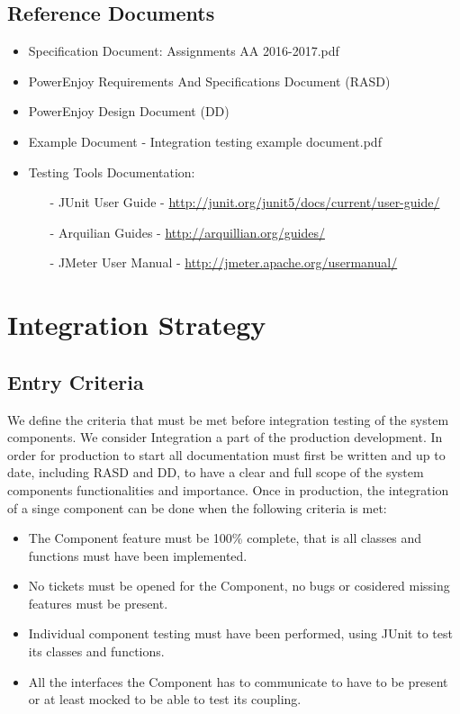 \documentclass[a4paper]{article}
\begin{document}
\subsection{Reference Documents}
\begin{itemize}
\item Specification Document: Assignments AA 2016-2017.pdf
\item PowerEnjoy Requirements And Specifications Document (RASD)
\item PowerEnjoy Design Document (DD)
\item Example Document - Integration testing example document.pdf
\item Testing Tools Documentation:
\begin{itemize}
\item[-] JUnit User Guide - \url{http://junit.org/junit5/docs/current/user-guide/}
\item[-] Arquilian Guides - \url{http://arquillian.org/guides/}
\item[-] JMeter User Manual - \url{http://jmeter.apache.org/usermanual/}
\end{itemize}
\end{itemize}


\newpage
\section{Integration Strategy}
\subsection{Entry Criteria}
We define the criteria that must be met before integration testing of the system components. We consider Integration a part of the production development. In order for production to start all documentation must first be written and up to date, including RASD and DD, to have a clear and full scope of the system components functionalities and importance. Once in production, the integration of a singe component can be done when the following criteria is met:
\begin{itemize}
\item The Component feature must be 100\% complete, that is all classes and functions must have been implemented.
\item No tickets must be opened for the Component, no bugs or cosidered missing features must be present.
\item Individual component testing must have been performed, using JUnit to test its classes and functions.
\item All the interfaces the Component has to communicate to have to be present or at least mocked to be able to test its coupling.
\end{itemize}
  
\end{document}
